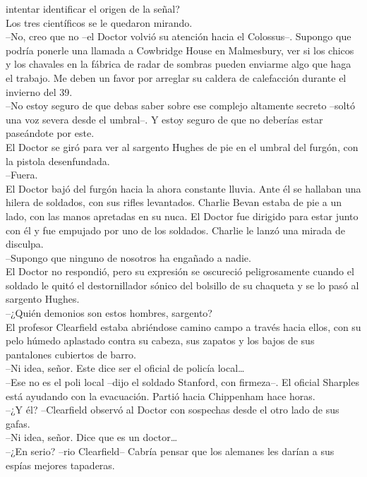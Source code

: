 intentar identificar el origen de la señal?\\
Los tres científicos se le quedaron mirando.\\
--No, creo que no --el Doctor volvió su atención hacia el Colossus--.
Supongo que podría ponerle una llamada a Cowbridge House en Malmesbury,
ver si los chicos y los chavales en la fábrica de radar de sombras
pueden enviarme algo que haga el trabajo. Me deben un favor por arreglar
su caldera de calefacción durante el invierno del 39.\\
--No estoy seguro de que debas saber sobre ese complejo altamente
secreto --soltó una voz severa desde el umbral--. Y estoy seguro de que
no deberías estar paseándote por este.\\
El Doctor se giró para ver al sargento Hughes de pie en el umbral del
furgón, con la pistola desenfundada.\\
--Fuera.\\[2\baselineskip]El Doctor bajó del furgón hacia la ahora
constante lluvia. Ante él se hallaban una hilera de soldados, con sus
rifles levantados. Charlie Bevan estaba de pie a un lado, con las manos
apretadas en su nuca. El Doctor fue dirigido para estar junto con él y
fue empujado por uno de los soldados. Charlie le lanzó una mirada de
disculpa.\\
--Supongo que ninguno de nosotros ha engañado a nadie.\\
El Doctor no respondió, pero su expresión se oscureció peligrosamente
cuando el soldado le quitó el destornillador sónico del bolsillo de su
chaqueta y se lo pasó al sargento Hughes.\\
--¿Quién demonios son estos hombres, sargento?\\
El profesor Clearfield estaba abriéndose camino campo a través hacia
ellos, con su pelo húmedo aplastado contra su cabeza, sus zapatos y los
bajos de sus pantalones cubiertos de barro.\\
--Ni idea, señor. Este dice ser el oficial de policía local\ldots{}\\
--Ese no es el poli local --dijo el soldado Stanford, con firmeza--. El
oficial Sharples está ayudando con la evacuación. Partió hacia
Chippenham hace horas.\\
--¿Y él? --Clearfield observó al Doctor con sospechas desde el otro lado
de sus gafas.\\
--Ni idea, señor. Dice que es un doctor\ldots{}\\
--¿En serio? --rio Clearfield-- Cabría pensar que los alemanes les
darían a sus espías mejores tapaderas.\\
